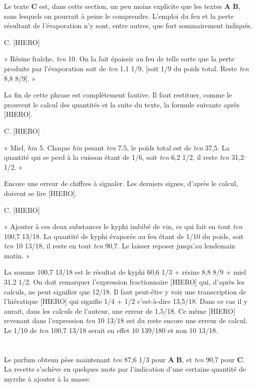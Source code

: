 \documentclass[a4paper, 11pt, oneside, landscape]{article}
\begin{document}
Le texte \textbf{C} est, dans cette section, un peu moins explicite que les textes \textbf{A} \textbf{B}, sans lesquels on pourrait à peine le comprendre. L'emploi du feu et la perte résultant de l'évaporation n'y sont, entre autres, que fort sommairement indiqués.

C. [HIERO]

« Résine fraîche, \emph{ten} 10. On la fait épaissir au feu de telle sorte que la perte produite par l'évaporation soit de \emph{ten} 1,1 1/9, [soit 1/9 du poids total. Reste \emph{ten} 8,8 8/9]. »

La fin de cette phrase est complètement fautive. Il faut restituer, comme le prouvent le calcul des quantités et la suite du texte, la formule suivante après [HIERO].

C. [HIERO]

« Miel, \emph{hin} 5. Chaque \emph{hin} pesant \emph{ten} 7.5, le poids total est de \emph{ten} 37,5. La quantité qui se perd à la cuisson étant de 1/6, soit \emph{ten} 6,2 1/2, il reste \emph{ten} 31,2 1/2. »

Encore une erreur de chiffres à signaler. Les derniers signes, d'après le calcul, doivent se lire [HIERO]. 

C. [HIERO]

« Ajouter à ces deux substances le kyphi imbibé de vin, ce qui fait en tout \emph{ten} 100,7 13/18. La quantité de kyphi évaporée au feu étant de 1/10 du poids, soit \emph{ten} 10 13/18, il reste en tout \emph{ten} 90,7. Le laisser reposer jusqu'au lendemain matin. »

La somme 100,7 13/18 est le résultat de kyphi 60,6 1/3 + résine 8,8 8/9 + miel 31,2 1/2. On doit remarquer l'expression fractionnaire [HIERO] qui, d'après les calculs, ne peut signifier que 12/18. Il faut peut-être y voir une transcription de l'hiératique [HIERO] qui signifie 1/4 + 1/2 c'est-à-dire 13,5/18. Dans ce cas il y aurait, dans les calculs de l'auteur, une erreur de 1,5/18. Ce même [HIERO] revenant dans l'expression \emph{ten} 10 13/18 est du reste encore une erreur de calcul. Le 1/10 de \emph{ten} 100,7 13/18 serait en effet 10 139/180 et non 10 13/18.
\clearpage
\section{}
\paragraph{}
Le parfum obtenu pèse maintenant \emph{ten} 87,6 1/3 pour \textbf{A} \textbf{B}, et \emph{ten} 90,7 pour \textbf{C}. La recette s'achève en quelques mots par l'indication d'une certaine quantité de myrrhe à ajouter à la masse.
\end{document}
